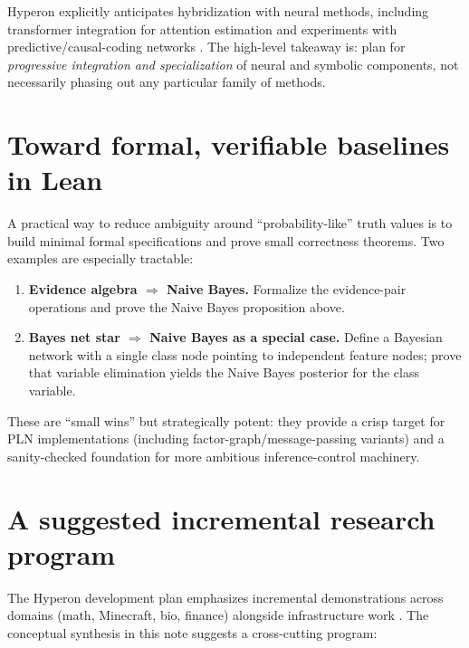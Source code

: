 \documentclass[11pt]{article}
\begin{document}
Hyperon explicitly anticipates hybridization with neural methods, including transformer integration
for attention estimation and experiments with predictive/causal-coding networks \cite{hyperon-plan,hyperon-overview}.
The high-level takeaway is: plan for \emph{progressive integration and specialization} of neural and symbolic
components, not necessarily phasing out any particular family of methods.

\section{Toward formal, verifiable baselines in Lean}

A practical way to reduce ambiguity around ``probability-like'' truth values is to
build minimal formal specifications and prove small correctness theorems.
Two examples are especially tractable:

\begin{enumerate}[leftmargin=*]
\item \textbf{Evidence algebra \texorpdfstring{$\Rightarrow$}{=>} Naive Bayes.}
Formalize the evidence-pair operations and prove the Naive Bayes proposition above.

\item \textbf{Bayes net star \texorpdfstring{$\Rightarrow$}{=>} Naive Bayes as a special case.}
Define a Bayesian network with a single class node pointing to independent feature nodes;
prove that variable elimination yields the Naive Bayes posterior for the class variable.
\end{enumerate}

These are ``small wins'' but strategically potent:
they provide a crisp target for PLN implementations (including factor-graph/message-passing variants)
and a sanity-checked foundation for more ambitious inference-control machinery.

\section{A suggested incremental research program}

The Hyperon development plan emphasizes incremental demonstrations across domains (math, Minecraft,
bio, finance) alongside infrastructure work \cite{hyperon-plan}.
The conceptual synthesis in this note suggests a cross-cutting program:
\end{document}
